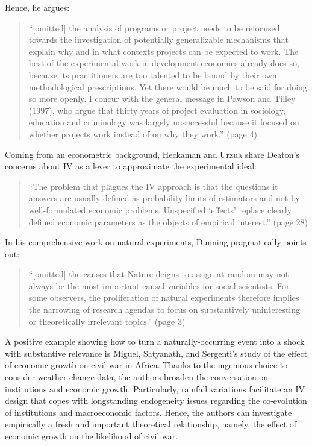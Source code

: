 \begin{refsection}
Hence, he argues:

\begin{quote}
  ``[omitted] the analysis of programs or project needs to be refocused towards
  the investigation of potentially generalizable mechanisms that explain why and
  in what contexts projects can be expected to work. The best of the
  experimental work in development economics already does so, because its
  practitioners are too talented to be bound by their own methodological
  prescriptions. Yet there would be much to be said for doing so more openly. I
  concur with the general message in Pawson and Tilley (1997), who argue that
  thirty years of project evaluation in sociology, education and criminology was
  largely unsuccessful because it focused on whether projects work instead of on
  why they work.'' (page 4)
\end{quote}

Coming from an econometric background, Heckaman and Urzua
\parencite*{heckman_urzua_2010} share Deaton's concerns about IV as a lever to
approximate the experimental ideal:

\begin{quote}
  ``The problem that plagues the IV approach is that the questions it answers are
  usually defined as probability limits of estimators and not by well-formulated
  economic problems. Unspecified `effects' replace clearly defined economic
  parameters as the objects of empirical interest.'' (page 28)
\end{quote}

In his comprehensive work on natural experiments, Dunning 
\parencite*{dunning_2012} pragmatically points out:

\begin{quote}
  ``[omitted] the causes that Nature deigns to assign at random may not always be
  the most important causal variables for social scientists. For some observers,
  the proliferation of natural experiments therefore implies the narrowing of
  research agendas to focus on substantively uninteresting or theoretically
  irrelevant topics.'' (page 3)
\end{quote}

A positive example showing how to turn a naturally-occurring event into a shock
with substantive relevance is Miguel, Satyanath, and Sergenti's
\parencite*{miguel_et_al_2004} study of the effect of economic growth on civil
war in Africa. Thanks to the ingenious choice to consider weather change data,
the authors broaden the conversation on institutions and economic growth.
Particularly, rainfall variations facilitate an IV design that copes with
longstanding endogeneity issues regarding the co-evolution of institutions and
macroeconomic factors. Hence, the authors can investigate empirically a fresh
and important theoretical relationship, namely, the effect of economic growth on
the likelihood of civil war. 


\end{refsection}
